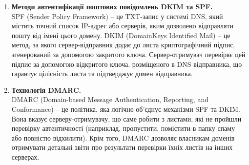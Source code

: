 \documentclass[14pt, a4paper]{extreport}
\begin{document}
\begin{enumerate}
		\item \textbf{Методи автентифікації поштових повідомлень DKIM та SPF.} \\ SPF (Sender Policy Framework) -- це TXT-запис у системі DNS, який містить точний список IP-адрес або серверів, яким дозволено відправляти пошту від імені цього домену. DKIM (DomainKeys Identified Mail) -- це метод, за якого сервер-відправник додає до листа криптографічний підпис, згенерований за допомогою закритого ключа. Сервер-отримувач перевіряє цей підпис за допомогою відкритого ключа, розміщеного в DNS відправника, що гарантує цілісність листа та підтверджує домен відправника.
		
		\item \textbf{Технологія DMARC.} \\ DMARC (Domain-based Message Authentication, Reporting, and Conformance) -- це політика, яка логічно об'єднує механізми SPF та DKIM. Вона вказує серверу-отримувачу, що саме робити з листами, які не пройшли перевірку автентичності (наприклад, пропустити, помістити в папку спаму або повністю відхилити). Крім того, DMARC дозволяє власникам доменів отримувати детальні звіти про результати перевірки їхніх листів на інших серверах.
	\end{enumerate}
\end{document}
